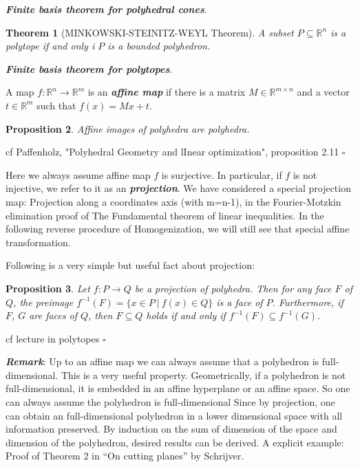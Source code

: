\documentclass{article}
\newcounter{lecnum}
\newtheorem{theorem}{Theorem}[lecnum]
\newtheorem{proposition}[theorem]{Proposition}
\newenvironment{proof}{{\it Proof.}}{ \hfill $\square$}
\def\R{{\mathbb R}}
\begin{document}
\emph{\textbf{Finite basis theorem for polyhedral cones}}.

\begin{theorem}[M{\scriptsize INKOWSKI}-S{\scriptsize TEINITZ}-W{\scriptsize EYL} Theorem]
A subset $P\subseteq\R^n$ is a polytope if and only i $P$ is a bounded polyhedron.
\end{theorem}

\emph{\textbf{Finite basis theorem for polytopes}}.

A map $f:\R^n \rightarrow \R^m$ is an \emph{\textbf{affine map}} if there is a matrix $M\in\R^{m\times n}$ and a vector $t\in\R^m$ such that $f(x)=Mx+t$. 

\begin{proposition}
Affine images of polyhedra are polyhedra.
\end{proposition}
\begin{proof}
cf Paffenholz, "Polyhedral Geometry and lInear optimization", proposition 2.11
\end{proof}

Here we always assume affine map $f$ is surjective. In particular, if $f$ is not injective, we refer to it as an \emph{\textbf{projection}}. We have considered a special projection map: Projection along a coordinates axis (with m=n-1), in the Fourier-Motzkin elimination proof of The Fundamental theorem of linear inequalities. In the following reverse procedure of Homogenization, we will still see that special affine transformation.

Following is a very simple but useful fact about projection:
\begin{proposition}
Let $f:P\rightarrow Q$ be a projection of polyhedra. Then for any face $F$ of $Q$, the preimage $f^{-1}(F)=\{x\in P~|~f(x)\in Q \}$ is a face of $P$. Furthermore, if $F$, $G$ are faces of $Q$, then $F\subseteq Q$ holds if and only if $f^{-1}(F)\subseteq f^{-1}(G)$.
\end{proposition}
\begin{proof}
cf lecture in polytopes
\end{proof}

\emph{\textbf{Remark}}: Up to an affine map we can always assume that a polyhedron is full-dimensional. This is a very useful property. Geometrically, if a polyhedron is not full-dimensional, it is embedded in an affine hyperplane or an affine space. So one can always assume the polyhedron is full-dimensional Since by projection, one can obtain an full-dimensional polyhedron in a lower dimensional space with all information preserved. By induction on the sum of dimension of the space and dimension of the polyhedron, desired results can be derived. A explicit example: Proof of Theorem 2 in ``On cutting planes'' by Schrijver.
\end{document}
